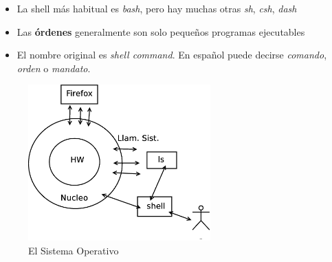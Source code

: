 \documentclass[ucs]{beamer}
\begin{document}
\begin{frame}[fragile]

\begin{itemize}
\item  La shell más habitual es \emph{bash}, pero hay muchas otras \emph{sh}, \emph{csh}, \emph{dash}
\item Las \textbf{órdenes} generalmente son solo pequeños programas ejecutables
\item El nombre original es \emph{shell command}. En español puede decirse \emph{comando}, \emph{orden}
o \emph{mandato}. 


%


\end{itemize}
\end{frame}





\begin{frame}[fragile]
\begin{figure}
\centerline{\includegraphics[width=7cm]{figs/nucleo_y_shell}}
\caption{El Sistema Operativo}
\end{figure}
\end{frame}
\end{document}
